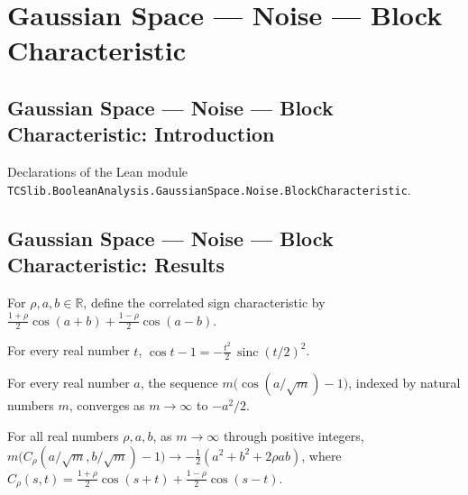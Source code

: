 \section{Gaussian Space --- Noise --- Block Characteristic}
\subsection*{Gaussian Space --- Noise --- Block Characteristic: Introduction}

Declarations of the Lean module \texttt{TCSlib.BooleanAnalysis.GaussianSpace.Noise.BlockCharacteristic}.

\subsection*{Gaussian Space --- Noise --- Block Characteristic: Results}

\begin{definition}
\label{BooleanAnalysis.GaussianSpace.correlatedSignCharacteristic}
\leanok
For $\rho,a,b\in\mathbb R$, define the correlated sign characteristic by
$\frac{1+\rho}{2}\cos(a+b)+\frac{1-\rho}{2}\cos(a-b)$.
\end{definition}

\begin{lemma}
\label{BooleanAnalysis.GaussianSpace.cos_sub_one_eq_sinc}
\leanok
{}
For every real number $t$, $\cos t-1=-\frac{t^2}{2}\,\operatorname{sinc}(t/2)^2$.
\end{lemma}

\begin{lemma}
\label{BooleanAnalysis.GaussianSpace.tendsto_nat_mul_cos_div_sqrt_sub_one}
\leanok
{}
For every real number $a$, the sequence $m\bigl(\cos(a/\sqrt m)-1\bigr)$, indexed by
natural numbers $m$, converges as $m\to\infty$ to $-a^2/2$.
\end{lemma}

\begin{lemma}
\label{BooleanAnalysis.GaussianSpace.tendsto_nat_mul_correlatedSignCharacteristic_sub_one}
\leanok
{}
For all real numbers $\rho,a,b$, as $m\to\infty$ through positive integers,
$m\bigl(C_\rho(a/\sqrt m,b/\sqrt m)-1\bigr)\to-\tfrac12(a^2+b^2+2\rho ab)$, where
$C_\rho(s,t)=\frac{1+\rho}{2}\cos(s+t)+\frac{1-\rho}{2}\cos(s-t)$.
\end{lemma}

